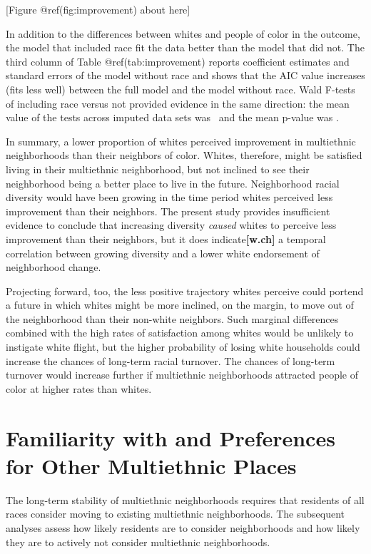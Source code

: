 \documentclass{baderart}
\begin{document}
{[}Figure @ref(fig:improvement) about here{]}

In addition to the differences between whites and people of color in the outcome, the model that included race fit the data better than the model that did not. The third column of Table @ref(tab:improvement) reports coefficient estimates and standard errors of the model without race and shows that the AIC value increases (fits less well) between the full model and the model without race. Wald F-tests of including race versus not provided evidence in the same direction: the mean value of the tests across imputed data sets was \betWaldF~and the mean p-value was \betWaldp.

In summary, a lower proportion of whites perceived improvement in multiethnic neighborhoods than their neighbors of color. Whites, therefore, might be satisfied living in their multiethnic neighborhood, but not inclined to see their neighborhood being a better place to live in the future. Neighborhood racial diversity would have been growing in the time period whites perceived less improvement than their neighbors. The present study provides insufficient evidence to conclude that increasing diversity \emph{caused} whites to perceive less improvement than their neighbors, but it does indicate\textbf{{[}w.ch{]}} a temporal correlation between growing diversity and a lower white endorsement of neighborhood change.

Projecting forward, too, the less positive trajectory whites perceive could portend a future in which whites might be more inclined, on the margin, to move out of the neighborhood than their non-white neighbors. Such marginal differences combined with the high rates of satisfaction among whites would be unlikely to instigate white flight, but the higher probability of losing white households could increase the chances of long-term racial turnover. The chances of long-term turnover would increase further if multiethnic neighborhoods attracted people of color at higher rates than whites.

\section{Familiarity with and Preferences for Other Multiethnic Places}\label{familiarity-with-and-preferences-for-other-multiethnic-places}

The long-term stability of multiethnic neighborhoods requires that residents of all races consider moving to existing multiethnic neighborhoods. The subsequent analyses assess how likely residents are to consider neighborhoods and how likely they are to actively not consider multiethnic neighborhoods.
\end{document}
